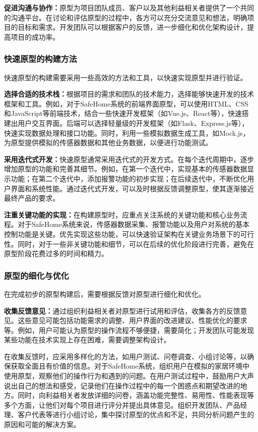 \textbf{促进沟通与协作：}原型为项目团队成员、客户以及其他利益相关者提供了一个共同的沟通平台。在讨论和评估原型的过程中，各方可以充分交流意见和想法，明确项目的目标和需求。开发团队可以根据客户的反馈，进一步细化和优化架构设计，提高项目的成功率。

\subsubsection{快速原型的构建方法}

快速原型的构建需要采用一些高效的方法和工具，以快速实现原型并进行验证。

\textbf{选择合适的技术栈：}根据项目的需求和团队的技术能力，选择能够快速开发的技术框架和工具。例如，对于SafeHome系统的前端界面原型，可以使用HTML、CSS和JavaScript等前端技术，结合一些快速开发框架（如Vue.js、React等），快速搭建出用户交互界面。后端可以选择轻量级的开发框架（如Flask、Express.js等），快速实现数据处理和接口功能。同时，利用一些模拟数据生成工具，如Mock.js，为原型提供模拟的传感器数据和其他业务数据，以便进行功能测试。

\textbf{采用迭代式开发：}快速原型通常采用迭代式的开发方式。在每个迭代周期中，逐步增加原型的功能和完善其细节。例如，在第一个迭代中，实现基本的传感器数据显示功能；在第二个迭代中，添加报警功能的初步实现；在后续迭代中，不断优化用户界面和系统性能。通过迭代式开发，可以及时根据反馈调整原型，使其逐渐接近最终产品的要求。

\textbf{注重关键功能的实现：}在构建原型时，应重点关注系统的关键功能和核心业务流程。对于SafeHome系统来说，传感器数据采集、报警功能以及用户对系统的基本控制功能是关键。优先实现这些功能，可以快速验证架构在关键业务场景下的可行性。同时，对于一些非关键功能和细节，可以在后续的优化阶段进行完善，避免在原型阶段花费过多的时间和精力。

\subsubsection{原型的细化与优化}

在完成初步的原型构建后，需要根据反馈对原型进行细化和优化。

\textbf{收集反馈意见：}通过组织利益相关者对原型进行试用和评估，收集各方的反馈意见。这些意见可能包括功能需求的调整、用户界面的改进建议、性能优化的要求等。例如，用户可能认为原型的操作流程不够便捷，需要简化；开发团队可能发现某些功能在技术实现上存在困难，需要调整架构设计。

在收集反馈时，应采用多样化的方法，如用户测试、问卷调查、小组讨论等，以确保获取全面且有价值的信息。对于SafeHome系统，组织用户在模拟的家居环境中使用原型，观察他们的操作行为和遇到的问题。在用户测试过程中，鼓励用户大声说出自己的想法和感受，记录他们在操作过程中的每一个困惑点和期望改进的地方。同时，向利益相关者发放详细的问卷，涵盖功能完整性、易用性、性能表现等多个方面，让他们对每个项目进行评分并提出具体意见。组织开发团队、产品经理、客户代表等进行小组讨论，集中探讨原型的优点和不足，共同分析问题产生的原因和可能的解决方案。

